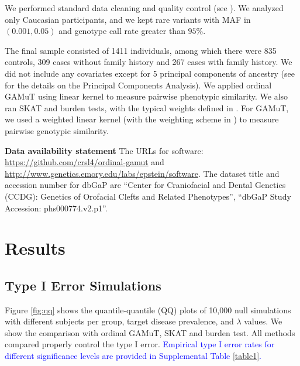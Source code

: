 \documentclass[]{article}
\begin{document}
We performed standard data cleaning and quality control (see \citet{Leslie2016}). We analyzed only Caucasian participants, and we kept rare variants with MAF in \((0.001,0.05)\) and genotype call rate greater than \(95\%\).

The final sample consisted of 1411 individuals, among which there were 835 controls, 309 cases without family history and 267 cases with family history. We did not include any covariates except for 5 principal components of ancestry (see \citet{Leslie2016} for the details on the Principal Components Analysis).
We applied ordinal GAMuT using linear kernel to measure pairwise phenotypic similarity.
We also ran SKAT and burden tests, with the typical weights defined in \citet{Wu2011}. For GAMuT, we used a weighted linear kernel (with the weighting scheme in \citet{Wu2011}) to measure pairwise genotypic similarity.

\textbf{Data availability statement } The URLs for software: \url{https://github.com/crsl4/ordinal-gamut} and \url{http://www.genetics.emory.edu/labs/epstein/software}. The dataset title and accession number for dbGaP are ``Center for Craniofacial and Dental Genetics (CCDG): Genetics of Orofacial Clefts and Related Phenotypes'', ``dbGaP Study Accession: phs000774.v2.p1''.

\hypertarget{results}{%
\section{Results}\label{results}}

\hypertarget{type-i-error-simulations}{%
\subsection{Type I Error Simulations}\label{type-i-error-simulations}}

Figure \ref{fig:qq} shows the quantile-quantile (QQ) plots of 10,000 null simulations with different subjects per group, target disease prevalence, and \(\lambda\) values. We show the comparison with ordinal GAMuT, SKAT and burden test. All methods compared properly control the type I error. \textcolor{blue}{Empirical type I error rates for different significance levels are provided in Supplemental Table \ref{table1}.}
\end{document}
